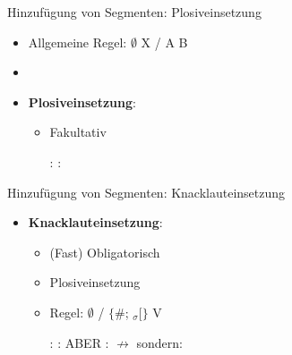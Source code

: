 %
%

\begin{frame}{Hinzufügung von Segmenten: Plosiveinsetzung}

\begin{itemize}
	\item Allgemeine Regel: $\emptyset$ \ras X / A \underline{\quad} B
	\item[]
	\item \textbf{Plosiveinsetzung}:
	
	\begin{itemize}
		\item Fakultativ
		
	\eal
		\ex {}:  \ras \textipa{[Pampt]}
		\ex {}:  \ras \textipa{[gants]}
	\zl
	
	\end{itemize}

\end{itemize}
\end{frame}


\begin{frame}{Hinzufügung von Segmenten: Knacklauteinsetzung}

\begin{itemize}
	\item \textbf{Knacklauteinsetzung}:

	\begin{itemize}
		\item (Fast) Obligatorisch
		\item Plosiveinsetzung
		\item Regel: $\emptyset$ \ras \textipa{[P]} / 
		$\{$\#; \textprimstress$_\sigma[\}$ 
\underline{\quad} V

	\eal
		\ex {}:  \ras {}
		\ex {}:  \ras \textipa{[Pa\t{pf}@l]}
		\ex ABER :  $\nrightarrow$ \textipa{[\textprimstress ge:.P@n]} sondern: \textipa{[\textprimstress ge:.@n]}
	\zl
	
	\end{itemize}
			
\end{itemize}

\end{frame}



